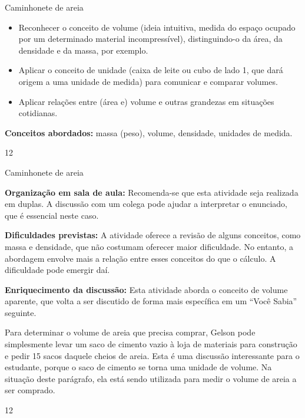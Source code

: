 \clearmargin
\begin{objectives}{Caminhonete de areia}
{
\begin{itemize}
\item {} 
Reconhecer o conceito de volume (ideia intuitiva, medida do espaço ocupado por um determinado material incompressível), distinguindo-o da área, da densidade e da massa, por exemplo.

\item {} 
Aplicar o conceito de unidade (caixa de leite ou cubo de lado 1, que dará origem a uma unidade de medida) para comunicar e comparar volumes.

\item {} 
Aplicar relações entre (área e) volume e outras grandezas em situações cotidianas.

\end{itemize}

\textbf{Conceitos abordados:} massa (peso), volume, densidade, unidades de medida.
}{1}{2}
\end{objectives}
\begin{sugestions}{Caminhonete de areia}
{
\textbf{Organização em sala de aula:} Recomenda-se que esta atividade seja realizada em duplas. A discussão com um colega pode ajudar a interpretar o enunciado, que é essencial neste caso.

\textbf{Dificuldades previstas:} A atividade oferece a revisão de alguns conceitos, como massa e densidade, que não costumam oferecer maior dificuldade. No entanto, a abordagem envolve mais a relação entre esses conceitos do que o cálculo. A dificuldade pode emergir daí.

\textbf{Enriquecimento da discussão:} Esta atividade aborda o conceito de volume aparente, que volta a ser discutido de forma mais específica em um “Você Sabia” seguinte.

Para determinar o volume de areia que precisa comprar, Gelson pode simplesmente levar um saco de cimento vazio à loja de materiais para construção e pedir 15 sacos daquele cheios de areia. Esta é uma discussão interessante para o estudante, porque o saco de cimento se torna uma unidade de volume. Na situação deste parágrafo, ela está sendo utilizada para medir o volume de areia a ser comprado.
}{1}{2}
\end{sugestions}


\label{\detokenize{GE504-0:explorando-o-conceito-de-volume}}\label{\detokenize{GE504-0::doc}}

